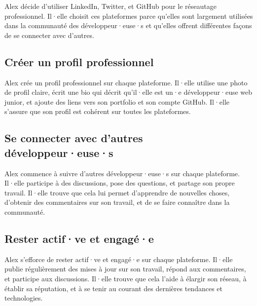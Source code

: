 Alex décide d'utiliser LinkedIn, Twitter, et GitHub pour le réseautage professionnel. Il·elle choisit ces plateformes parce qu'elles sont largement utilisées dans la communauté des développeur·euse·s et qu'elles offrent différentes façons de se connecter avec d'autres.

\subsection{Créer un profil professionnel}

Alex crée un profil professionnel sur chaque plateforme. Il·elle utilise une photo de profil claire, écrit une bio qui décrit qu'il·elle est un·e développeur·euse web junior, et ajoute des liens vers son portfolio et son compte GitHub. Il·elle s'assure que son profil est cohérent sur toutes les plateformes.

\subsection{Se connecter avec d'autres développeur·euse·s}

Alex commence à suivre d'autres développeur·euse·s sur chaque plateforme. Il·elle participe à des discussions, pose des questions, et partage son propre travail. Il·elle trouve que cela lui permet d'apprendre de nouvelles choses, d'obtenir des commentaires sur son travail, et de se faire connaître dans la communauté.

\subsection{Rester actif·ve et engagé·e}

Alex s'efforce de rester actif·ve et engagé·e sur chaque plateforme. Il·elle publie régulièrement des mises à jour sur son travail, répond aux commentaires, et participe aux discussions. Il·elle trouve que cela l'aide à élargir son réseau, à établir sa réputation, et à se tenir au courant des dernières tendances et technologies.


